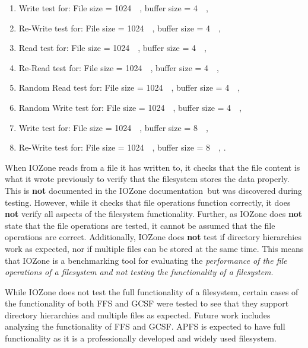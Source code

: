 \begin{enumerate}
	\item Write test for: File size = \SI{1024}{\kilo\byte}, buffer size = \SI{4}{\kilo\byte},
	\item \mbox{Re-Write} test for: File size = \SI{1024}{\kilo\byte}, buffer size = \SI{4}{\kilo\byte},
	\item Read test for: File size = \SI{1024}{\kilo\byte}, buffer size = \SI{4}{\kilo\byte},
	\item \mbox{Re-Read} test for: File size = \SI{1024}{\kilo\byte}, buffer size = \SI{4}{\kilo\byte},
	\item Random Read test for: File size = \SI{1024}{\kilo\byte}, buffer size = \SI{4}{\kilo\byte},
	\item Random Write test for: File size = \SI{1024}{\kilo\byte}, buffer size = \SI{4}{\kilo\byte},
	\item Write test for: File size = \SI{1024}{\kilo\byte}, buffer size = \SI{8}{\kilo\byte},
	\item \mbox{Re-Write} test for: File size = \SI{1024}{\kilo\byte}, buffer size = \SI{8}{\kilo\byte}, \etc.
\end{enumerate}

When IOZone reads from a file it has written to, it checks that the file content is what it wrote previously to verify that the filesystem stores the data properly. This is \textbf{not} documented in the IOZone documentation\,\cite{iozoneIozoneFilesystemBenchmark} but was discovered during testing. However, while it checks that file operations function correctly, it does \textbf{not} verify all aspects of the filesystem functionality. Further, as IOZone does \textbf{not} state that the file operations are tested, it cannot be assumed that the file operations are correct. Additionally, IOZone does \textbf{not} test if directory hierarchies work as expected, nor if multiple files can be stored at the same time. This means that IOZone is a benchmarking tool for evaluating the \textit{performance of the file operations of a filesystem and not testing the functionality of a filesystem}.

While IOZone does not test the full functionality of a filesystem, certain cases of the functionality of both \gls{FFS} and \gls{GCSF} were tested to see that they support directory hierarchies and multiple files as expected. Future work includes analyzing the functionality of \gls{FFS} and \gls{GCSF}. \gls{APFS} is expected to have full functionality as it is a professionally developed and widely used filesystem.

